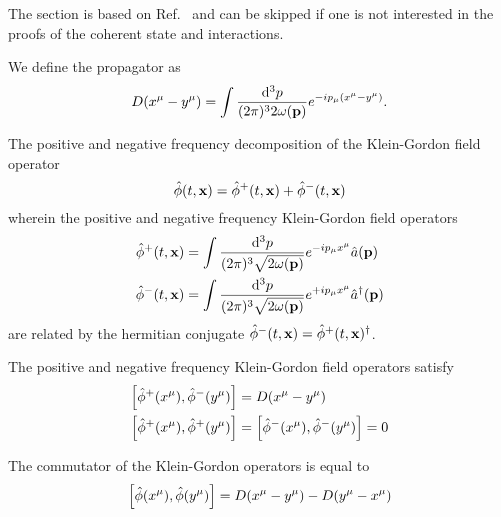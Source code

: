 The section is based on Ref.~\cite[p.~26]{Peskin1995} and can be skipped if one is not interested in the proofs of the coherent state and interactions.
\begin{definition}[Propagator]
	We define the propagator as
	\begin{equation}
		D(x^\mu-y^\mu)
		=
		\int\frac{\dd[3]{p}}{(2\pi)^32\omega(\vb{p})}
		e^{-ip_\mu (x^\mu-y^\mu)}
		.
	\end{equation}
\end{definition}
\begin{definition}
	The positive and negative frequency decomposition of the Klein-Gordon field operator
	\begin{equation}
		\hat\phi(t,\vb{x})
		=
		\hat\phi^+(t,\vb{x})
		+
		\hat\phi^-(t,\vb{x})
	\end{equation}
	wherein the positive and negative frequency Klein-Gordon field operators
	\begin{equation}
		\begin{split}
			\hat\phi^+(t,\vb{x})
			&=
			\int\frac{\dd[3]{p}}{(2\pi)^3\sqrt{2\omega(\vb{p})}}
			e^{-ip_\mu x^\mu}
			\hat{a}(\vb{p})
			\\
			\hat\phi^-(t,\vb{x})
			&=
			\int\frac{\dd[3]{p}}{(2\pi)^3\sqrt{2\omega(\vb{p})}}
			e^{+ip_\mu x^\mu}
			\hat{a}^\dagger(\vb{p})
		\end{split}
		\label{eq:qkg_positive_negative_frequency}
	\end{equation}
	are related by the hermitian conjugate $\hat\phi^-(t,\vb{x})=\hat\phi^+(t,\vb{x})^\dagger$.
\end{definition}
\begin{lemma}\label{thm:qkg_full_comm_pn_comm}
	The positive and negative frequency Klein-Gordon field operators satisfy
	\begin{align}
		\comm{\hat\phi^+(x^\mu)}{\hat\phi^-(y^\mu)}
		&=
		D(x^\mu-y^\mu)
		\\
		\comm{\hat\phi^+(x^\mu)}{\hat\phi^+(y^\mu)}
		&=
		\comm{\hat\phi^-(x^\mu)}{\hat\phi^-(y^\mu)}
		=
		0
	\end{align}
\end{lemma}
\begin{lemma}\label{thm:qkg_propagator_kg_comm}
	The commutator of the Klein-Gordon operators is equal to
	\begin{equation}
		\comm{\hat\phi(x^\mu)}{\hat\phi(y^\mu)}
		=
		D(x^\mu-y^\mu)
		-
		D(y^\mu-x^\mu)
	\end{equation}
\end{lemma}
